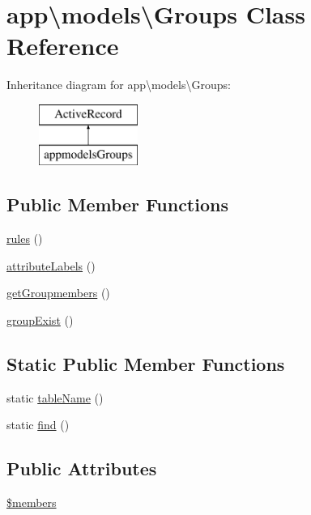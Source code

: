 \hypertarget{classapp_1_1models_1_1Groups}{}\section{app\textbackslash{}models\textbackslash{}Groups Class Reference}
\label{classapp_1_1models_1_1Groups}
Inheritance diagram for app\textbackslash{}models\textbackslash{}Groups\+:\begin{figure}[H]
\begin{center}
\leavevmode
\includegraphics[height=2.000000cm]{classapp_1_1models_1_1Groups}
\end{center}
\end{figure}
\subsection*{Public Member Functions}
\begin{DoxyCompactItemize}
\item 
\hyperlink{classapp_1_1models_1_1Groups_aeabe4f44c6f2f23ce0afaa919f75c6e6}{rules} ()
\item 
\hyperlink{classapp_1_1models_1_1Groups_abdb0c0d59f1e0cb700e1e4e647d3e27c}{attribute\+Labels} ()
\item 
\hyperlink{classapp_1_1models_1_1Groups_a906bf4d4731c890146ca08317cad371a}{get\+Groupmembers} ()
\item 
\hyperlink{classapp_1_1models_1_1Groups_ae0e9983874d3b4f4cb29379c4e517f72}{group\+Exist} ()
\end{DoxyCompactItemize}
\subsection*{Static Public Member Functions}
\begin{DoxyCompactItemize}
\item 
static \hyperlink{classapp_1_1models_1_1Groups_af375acf39fc7b9e6cb0d1010959febc5}{table\+Name} ()
\item 
static \hyperlink{classapp_1_1models_1_1Groups_a13c20f87fc05f3010d793415707cc993}{find} ()
\end{DoxyCompactItemize}
\subsection*{Public Attributes}
\begin{DoxyCompactItemize}
\item 
\hyperlink{classapp_1_1models_1_1Groups_a856dc426eef888fa04f70e36a3d5b93d}{\$members}
\end{DoxyCompactItemize}


